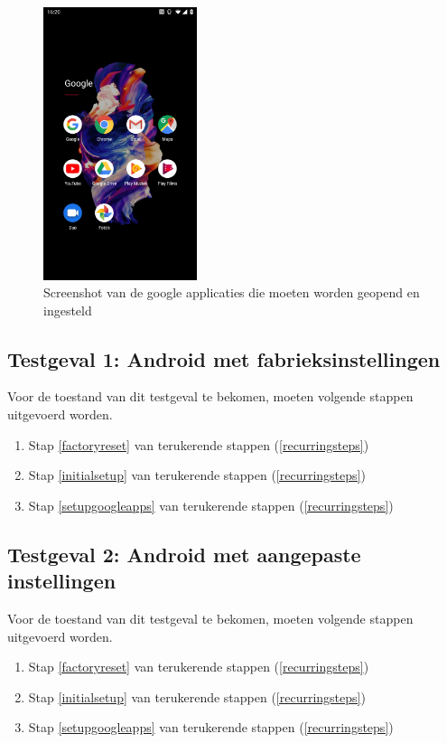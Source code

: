 \begin{figure}
    \centering
    \includegraphics[width=0.4\textwidth]{img/googleapps.jpg}
    \caption{Screenshot van de google applicaties die moeten worden geopend en ingesteld}
    \label{fig:googleapps}
\end{figure}

\subsection{Testgeval 1: Android met fabrieksinstellingen}

Voor de toestand van dit testgeval te bekomen, moeten volgende stappen uitgevoerd worden.
\begin{enumerate}
    \item Stap \ref{factoryreset} van terukerende stappen (\ref{recurringsteps})
    \item Stap \ref{initialsetup} van terukerende stappen (\ref{recurringsteps})
    \item Stap \ref{setupgoogleapps} van terukerende stappen (\ref{recurringsteps})
\end{enumerate}


\subsection{Testgeval 2: Android met aangepaste instellingen}

Voor de toestand van dit testgeval te bekomen, moeten volgende stappen uitgevoerd worden.

\begin{enumerate}
    \item Stap \ref{factoryreset} van terukerende stappen (\ref{recurringsteps})
    \item Stap \ref{initialsetup} van terukerende stappen (\ref{recurringsteps})
    \item Stap \ref{setupgoogleapps} van terukerende stappen (\ref{recurringsteps})
\end{enumerate}
    

